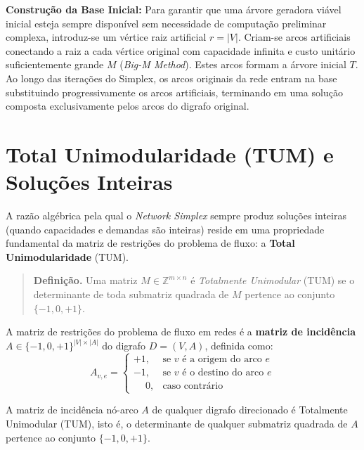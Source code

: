 \textbf{Construção da Base Inicial:} Para garantir que uma árvore geradora viável inicial esteja sempre disponível sem necessidade de computação preliminar complexa, introduz-se um vértice raiz artificial $r = |V|$. Criam-se arcos artificiais conectando a raiz a cada vértice original com capacidade infinita e custo unitário suficientemente grande $M$ (\textit{Big-M Method}). Estes arcos formam a árvore inicial $T$. Ao longo das iterações do Simplex, os arcos originais da rede entram na base substituindo progressivamente os arcos artificiais, terminando em uma solução composta exclusivamente pelos arcos do digrafo original.


\section{Total Unimodularidade (TUM) e Soluções Inteiras}\label{sec:tum_secao}

A razão algébrica pela qual o \textit{Network Simplex} sempre produz soluções inteiras (quando capacidades e demandas são inteiras) reside em uma propriedade fundamental da matriz de restrições do problema de fluxo: a \textbf{Total Unimodularidade} (TUM).

\begin{quote}
\textbf{Definição.} Uma matriz $M \in \mathbb{Z}^{m \times n}$ é \textit{Totalmente Unimodular} (TUM) se o determinante de toda submatriz quadrada de $M$ pertence ao conjunto $\{-1, 0, +1\}$.
\end{quote}

A matriz de restrições do problema de fluxo em redes é a \textbf{matriz de incidência} $A \in \{-1, 0, +1\}^{|V| \times |A|}$ do digrafo $D = (V, A)$, definida como:
\begin{equation}
    A_{v,e} = \begin{cases}
        +1, & \text{se } v \text{ é a origem do arco } e \\
        -1, & \text{se } v \text{ é o destino do arco } e \\
        \phantom{+}0, & \text{caso contrário}
    \end{cases}
\end{equation}

\begin{teorema}
A matriz de incidência nó-arco $A$ de qualquer digrafo direcionado é Totalmente Unimodular (TUM), isto é, o determinante de qualquer submatriz quadrada de $A$ pertence ao conjunto $\{-1, 0, +1\}$.
\end{teorema}

